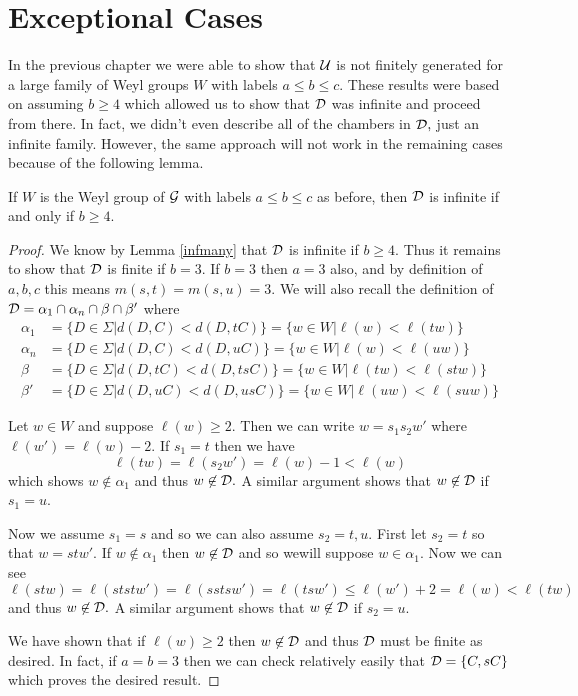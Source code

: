 \documentclass[class=book, crop=false]{standalone}
\begin{document}
\chapter{Exceptional Cases}
In the previous chapter we were able to show that $\mathcal{U}$ is not finitely generated for a large family of Weyl groups $W$ with labels $a\le b\le c.$ These results were based on assuming $b\ge 4$ which allowed us to show that $\mathcal{D}$ was infinite and proceed from there. In fact, we didn't even describe all of the chambers in $\mathcal{D},$ just an infinite family. However, the same approach will not work in the remaining cases because of the following lemma.
\begin{lemma} If $W$ is the Weyl group of $\mathcal{G}$ with labels $a\le b\le c$ as before, then $\mathcal{D}$ is infinite if and only if $b\ge 4.$
	\label{infD}
\end{lemma}
\begin{proof}
	We know by Lemma \ref{infmany} that $\mathcal{D}$ is infinite if $b\ge 4.$ Thus it remains to show that $\mathcal{D}$ is finite if $b=3.$ If $b=3$ then $a=3$ also, and by definition of $a,b,c$ this means $m(s,t)=m(s,u)=3.$ We will also recall the definition of $\mathcal{D}=\alpha_1\cap \alpha_n\cap \beta \cap \beta'$ where
	\begin{align*}
	\alpha_1&=\{D\in \Sigma|d(D,C)<d(D,tC)\}=\{w\in W|\ell(w)<\ell(tw)\}\\
	\alpha_n&=\{D\in \Sigma|d(D,C)<d(D,uC)\}=\{w\in W|\ell(w)<\ell(uw)\}\\
	\beta&=\{D\in \Sigma|d(D,tC)<d(D,tsC)\}=\{w\in W|\ell(tw)<\ell(stw)\}\\
	\beta'&=\{D\in \Sigma|d(D,uC)<d(D,usC)\}=\{w\in W|\ell(uw)<\ell(suw)\}
\end{align*}

Let $w\in W$ and suppose $\ell(w)\ge 2.$ Then we can write $w=s_1s_2w'$ where $\ell(w')=\ell(w)-2.$ If $s_1=t$ then we have
\[
	\ell(tw)=\ell(s_2w')=\ell(w)-1<\ell(w)
\]
which shows $w\not\in \alpha_1$ and thus $w\not\in \mathcal{D}.$ A similar argument shows that $w\not\in \mathcal{D}$ if $s_1=u.$

Now we assume $s_1=s$ and so we can also assume $s_2=t,u.$ First let $s_2=t$ so that $w=stw'.$ If $w\not\in \alpha_1$ then $w\not\in \mathcal{D}$ and so wewill suppose $w\in\alpha_1.$ Now we can see
\[
	\ell(stw)=\ell(ststw')=\ell(sstsw')=\ell(tsw')\le \ell(w')+2=\ell(w)<\ell(tw)
\]
and thus $w\not\in \mathcal{D}.$ A similar argument shows that $w\not\in \mathcal{D}$ if $s_2=u.$

We have shown that if $\ell(w)\ge 2$ then $w\not\in \mathcal{D}$ and thus $\mathcal{D}$ must be finite as desired. In fact, if $a=b=3$ then we can check relatively easily that $\mathcal{D}=\{C,sC\}$ which proves the desired result.
\end{proof}
\end{document}
